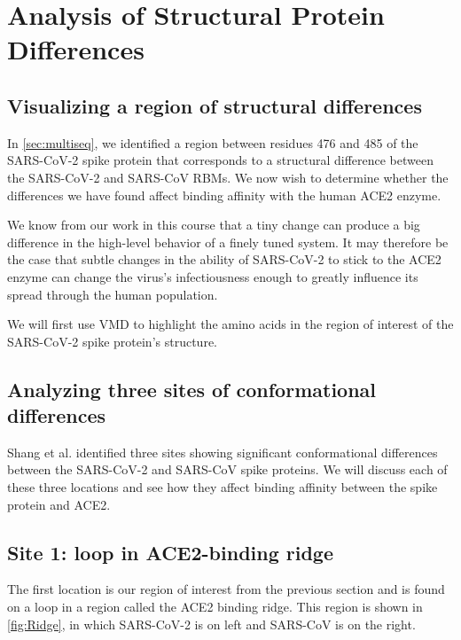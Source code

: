 \FloatBarrier
{}

\section{Analysis of Structural Protein Differences}
\label{sec:structural_differences}
\subsection{Visualizing a region of structural differences}

In \autoref{sec:multiseq}, we identified a region between residues 476 and 485 of the SARS-CoV-2 spike protein that corresponds to a structural difference between the SARS-CoV-2 and SARS-CoV RBMs. We now wish to determine whether the differences we have found affect binding affinity with the human ACE2 enzyme.

We know from our work in this course that a tiny change can produce a big difference in the high-level behavior of a finely tuned system. It may therefore be the case that subtle changes in the ability of SARS-CoV-2 to stick to the ACE2 enzyme can change the virus's infectiousness enough to greatly influence its spread through the human population.

We will first use VMD to highlight the amino acids in the region of interest of the SARS-CoV-2 spike protein's structure. 

\FloatBarrier
{}
\subsection{Analyzing three sites of conformational differences}

Shang et al. identified three sites showing significant conformational differences between the SARS-CoV-2 and SARS-CoV spike proteins. We will discuss each of these three locations and see how they affect binding affinity between the spike protein and ACE2.

\FloatBarrier
{}
\subsection{Site 1: loop in ACE2-binding ridge}

The first location is our region of interest from the previous section and is found on a loop in a region called the ACE2 binding ridge. This region is shown in \autoref{fig:Ridge}, in which SARS-CoV-2 is on left and SARS-CoV is on the right.

